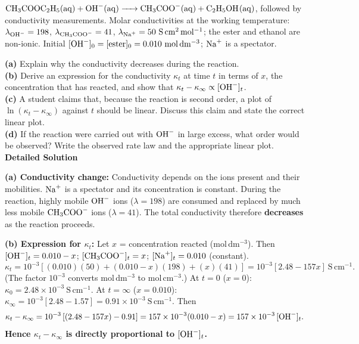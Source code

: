 \documentclass[11pt]{article}
\begin{document}
\begin{exoresolu}
$\ce{CH3COOC2H5(aq) + OH-(aq) -> CH3COO-(aq) + C2H5OH(aq)}$, followed by conductivity measurements.
Molar conductivities at the working temperature: $\lambda_{\ce{OH-}} = 198$, $\lambda_{\ce{CH3COO-}} = 41$, $\lambda_{\ce{Na+}} = 50\ \mathrm{S\,cm^2\,mol^{-1}}$; the ester and ethanol are non-ionic.
Initial $[\ce{OH-}]_0 = [\text{ester}]_0 = 0.010\ \mathrm{mol\,dm^{-3}}$; $\ce{Na+}$ is a spectator.

\textbf{(a)} Explain why the conductivity decreases during the reaction. \\
\textbf{(b)} Derive an expression for the conductivity $\kappa_t$ at time $t$ in terms of $x$, the concentration that has reacted, and show that $\kappa_t - \kappa_\infty \propto [\ce{OH-}]_t$. \\
\textbf{(c)} A student claims that, because the reaction is second order, a plot of $\ln(\kappa_t - \kappa_\infty)$ against $t$ should be linear. Discuss this claim and state the correct linear plot. \\
\textbf{(d)} If the reaction were carried out with $\ce{OH-}$ in large excess, what order would be observed? Write the observed rate law and the appropriate linear plot.
\tcblower
\textbf{Detailed Solution}

\textbf{(a) Conductivity change:} Conductivity depends on the ions present and their mobilities. $\ce{Na+}$ is a spectator and its concentration is constant. During the reaction, highly mobile $\ce{OH-}$ ions ($\lambda = 198$) are consumed and replaced by much less mobile $\ce{CH3COO-}$ ions ($\lambda = 41$). The total conductivity therefore \textbf{decreases} as the reaction proceeds.

\textbf{(b) Expression for $\kappa_t$:} Let $x$ = concentration reacted ($\mathrm{mol\,dm^{-3}}$). Then
$[\ce{OH-}]_t = 0.010 - x$; $[\ce{CH3COO-}]_t = x$; $[\ce{Na+}]_t = 0.010$ (constant).
\[ \kappa_t = 10^{-3}\left[ (0.010)(50) + (0.010 - x)(198) + (x)(41) \right] = 10^{-3}\left[ 2.48 - 157x \right]\ \mathrm{S\,cm^{-1}}. \]
(The factor $10^{-3}$ converts $\mathrm{mol\,dm^{-3}}$ to $\mathrm{mol\,cm^{-3}}$.)
At $t=0$ ($x=0$): $\kappa_0 = 2.48 \times 10^{-3}\ \mathrm{S\,cm^{-1}}$.
At $t=\infty$ ($x=0.010$): $\kappa_\infty = 10^{-3}[2.48 - 1.57] = 0.91 \times 10^{-3}\ \mathrm{S\,cm^{-1}}$.
Then
\[ \kappa_t - \kappa_\infty = 10^{-3}\left[ (2.48 - 157x) - 0.91 \right] = 157 \times 10^{-3}(0.010 - x) = 157 \times 10^{-3}\,[\ce{OH-}]_t. \]
\textbf{Hence $\kappa_t - \kappa_\infty$ is directly proportional to $[\ce{OH-}]_t$.}


\end{exoresolu}
\end{document}
